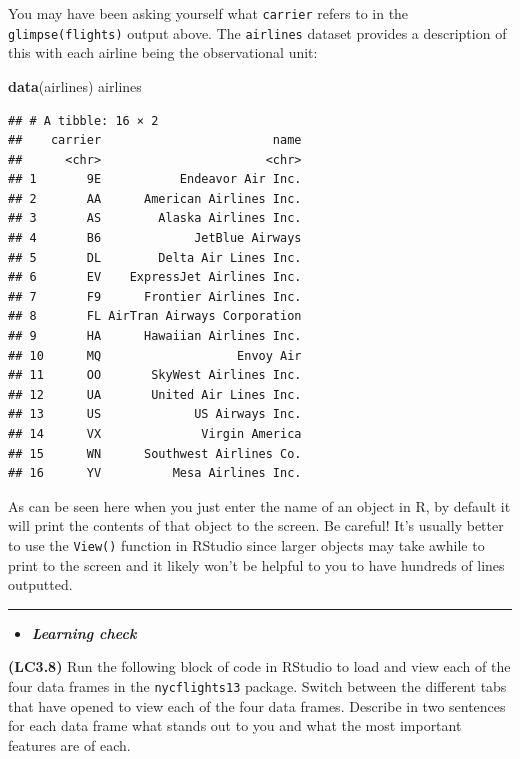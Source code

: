 \documentclass[]{tufte-book}
\newenvironment{Shaded}{\begin{snugshade}}{\end{snugshade}}
\newcommand{\KeywordTok}[1]{\textcolor[rgb]{0.13,0.29,0.53}{\textbf{{#1}}}}
\newcommand{\NormalTok}[1]{{#1}}
\let\oldrule=\rule
\renewcommand{\rule}[1]{\oldrule{\linewidth}}
\newenvironment{rmdblock}[1]
  {\begin{shaded*}
  \begin{itemize}
  \renewcommand{\labelitemi}{
    \raisebox{-.7\height}[0pt][0pt]{
    }
  }
  \item
  }
  {
  \end{itemize}
  \end{shaded*}
  }
\newenvironment{learncheck}
  {\begin{rmdblock}{warning}}
  {\end{rmdblock}}
\theoremstyle{definition}
\theoremstyle{definition}
\theoremstyle{remark}
\begin{document}
You may have been asking yourself what \texttt{carrier} refers to in the
\texttt{glimpse(flights)} output above. The \texttt{airlines} dataset
provides a description of this with each airline being the observational
unit:

\begin{Shaded}
\begin{Highlighting}[]
\KeywordTok{data}\NormalTok{(airlines)}
\NormalTok{airlines}
\end{Highlighting}
\end{Shaded}

\begin{verbatim}
## # A tibble: 16 × 2
##    carrier                        name
##      <chr>                       <chr>
## 1       9E           Endeavor Air Inc.
## 2       AA      American Airlines Inc.
## 3       AS        Alaska Airlines Inc.
## 4       B6             JetBlue Airways
## 5       DL        Delta Air Lines Inc.
## 6       EV    ExpressJet Airlines Inc.
## 7       F9      Frontier Airlines Inc.
## 8       FL AirTran Airways Corporation
## 9       HA      Hawaiian Airlines Inc.
## 10      MQ                   Envoy Air
## 11      OO       SkyWest Airlines Inc.
## 12      UA       United Air Lines Inc.
## 13      US             US Airways Inc.
## 14      VX              Virgin America
## 15      WN      Southwest Airlines Co.
## 16      YV          Mesa Airlines Inc.
\end{verbatim}

As can be seen here when you just enter the name of an object in R, by
default it will print the contents of that object to the screen. Be
careful! It's usually better to use the \texttt{View()} function in
RStudio since larger objects may take awhile to print to the screen and
it likely won't be helpful to you to have hundreds of lines outputted.

\begin{center}\rule{0.5\linewidth}{\linethickness}\end{center}

\begin{learncheck}
\textbf{\emph{Learning check}}
\end{learncheck}

\textbf{(LC3.8)} Run the following block of code in RStudio to load and
view each of the four data frames in the \texttt{nycflights13} package.
Switch between the different tabs that have opened to view each of the
four data frames. Describe in two sentences for each data frame what
stands out to you and what the most important features are of each.
\end{document}
